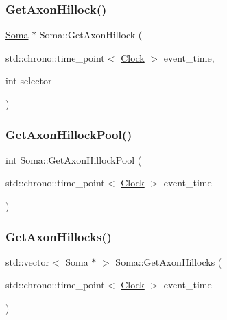 \mbox{\label{classSoma_ac8756f68dbaac8c70cfba435f7068a85}} 
\subsubsection{\texorpdfstring{Get\+Axon\+Hillock()}{GetAxonHillock()}}
{\footnotesize\ttfamily \mbox{\hyperlink{classSoma}{Soma}} $\ast$ Soma\+::\+Get\+Axon\+Hillock (\begin{DoxyParamCaption}\item[{std\+::chrono\+::time\+\_\+point$<$ \mbox{\hyperlink{universe_8h_a0ef8d951d1ca5ab3cfaf7ab4c7a6fd80}{Clock}} $>$}]{event\+\_\+time,  }\item[{int}]{selector }\end{DoxyParamCaption})}

\mbox{\label{classSoma_a23dc309849522d9f857fdcc71ea85877}} 
\subsubsection{\texorpdfstring{Get\+Axon\+Hillock\+Pool()}{GetAxonHillockPool()}}
{\footnotesize\ttfamily int Soma\+::\+Get\+Axon\+Hillock\+Pool (\begin{DoxyParamCaption}\item[{std\+::chrono\+::time\+\_\+point$<$ \mbox{\hyperlink{universe_8h_a0ef8d951d1ca5ab3cfaf7ab4c7a6fd80}{Clock}} $>$}]{event\+\_\+time }\end{DoxyParamCaption})\hspace{0.3cm}{\ttfamily [inline]}}

\mbox{\label{classSoma_af76f86d082c3f60442148ec843b586e7}} 
\subsubsection{\texorpdfstring{Get\+Axon\+Hillocks()}{GetAxonHillocks()}}
{\footnotesize\ttfamily std\+::vector$<$ \mbox{\hyperlink{classSoma}{Soma}} $\ast$ $>$ Soma\+::\+Get\+Axon\+Hillocks (\begin{DoxyParamCaption}\item[{std\+::chrono\+::time\+\_\+point$<$ \mbox{\hyperlink{universe_8h_a0ef8d951d1ca5ab3cfaf7ab4c7a6fd80}{Clock}} $>$}]{event\+\_\+time }\end{DoxyParamCaption})}

